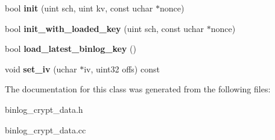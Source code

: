 \begin{DoxyCompactItemize}
bool {\bfseries init} (uint sch, uint kv, const uchar $\ast$nonce)
\item 
\mbox{\label{classBinlog__crypt__data_a65115a1311fcb7a53c2de5a26b30a7b8}} 
bool {\bfseries init\+\_\+with\+\_\+loaded\+\_\+key} (uint sch, const uchar $\ast$nonce)
\item 
\mbox{\label{classBinlog__crypt__data_a9b981a2b129ab316a267a81b27cfffd0}} 
bool {\bfseries load\+\_\+latest\+\_\+binlog\+\_\+key} ()
\item 
\mbox{\label{classBinlog__crypt__data_a32325b67626e6bf724b3d28a29cd7732}} 
void {\bfseries set\+\_\+iv} (uchar $\ast$iv, uint32 offs) const
\end{DoxyCompactItemize}


The documentation for this class was generated from the following files\+:\begin{DoxyCompactItemize}
\item 
binlog\+\_\+crypt\+\_\+data.\+h\item 
binlog\+\_\+crypt\+\_\+data.\+cc\end{DoxyCompactItemize}
